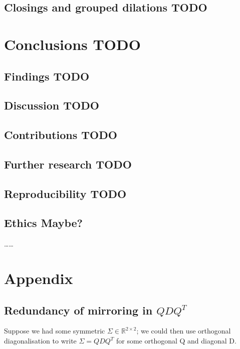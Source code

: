 \documentclass[a4paper, 12pt]{report}
\def\comment#1{\color{red}#1\color{black}}
\begin{document}
\section{Closings and grouped dilations  \comment{TODO}}


\chapter{Conclusions \comment{TODO}}

\section{Findings \comment{TODO}}
\section{Discussion \comment{TODO}}

\newpage
\section{Contributions \comment{TODO}}
\section{Further research \comment{TODO}}

\section{Reproducibility \comment{TODO}}
\section{Ethics \comment{Maybe?}}
\comment{\ldots\ldots}


{\footnotesize }

\newpage
\chapter{Appendix}
\section{Redundancy of mirroring in $QDQ^T$}
\label{sec:red-mirr}
Suppose we had some symmetric $\Sigma \in \mathbb{R}^{2\times 2}$; we could then use orthogonal diagonalisation to write $\Sigma = QDQ^T$ for some orthogonal Q and diagonal D.
\end{document}
